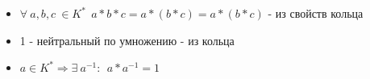 \begin{itemize}
    \item $\forall \ a,b,c \ \in K^* \ \  a*b*c = a*(b*c) = a*(b*c)$ - из свойств кольца
     \item 1  - нейтральный по умножению - из кольца
      \item $a \in K^* \Longrightarrow \exists \ a^{-1}: \ \ a*a^{-1} = 1$
\end{itemize}
